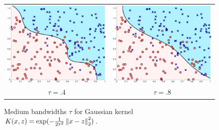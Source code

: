 \documentclass{article}
\begin{document}
\begin{figure}[ht]
  \begin{center}
    \begin{tabular}{cc}
      \hspace{-2cm}
      \includegraphics[width=.6\columnwidth,clip]{kernel_train_0.400.eps} &
      \hspace{-.5cm}
      \includegraphics[width=.6\columnwidth,clip]{kernel_train_0.800.eps} \\
      \hspace{-2cm} $\tau = .4$ & \hspace{-.5cm} $\tau = .8$
    \end{tabular}
    \caption{\label{fig:kernel-bandwidths-medium} Medium bandwidths
      $\tau$ for Gaussian kernel $K(x, z) = \exp(-\frac{1}{2 \tau^2}
      \left\|{x - z}\right\|_2^2)$.}
  \end{center}
\end{figure}
\end{document}
